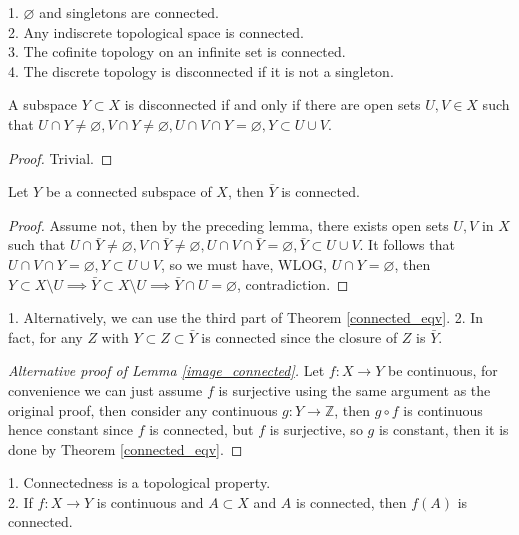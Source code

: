 \begin{example}
    1. $\varnothing$ and singletons are connected.\\
    2. Any indiscrete topological space is connected.\\
    3. The cofinite topology on an infinite set is connected.\\
    4. The discrete topology is disconnected if it is not a singleton.
\end{example}
\begin{lemma}
    A subspace $Y\subset X$ is disconnected if and only if there are open sets $U,V\in X$ such that $U\cap Y\neq\varnothing, V\cap Y\neq\varnothing, U\cap V\cap Y=\varnothing, Y\subset U\cup V$.
\end{lemma}
\begin{proof}
    Trivial.
\end{proof}
\begin{proposition}\label{closure_connected}
    Let $Y$ be a connected subspace of $X$, then $\bar Y$ is connected.
\end{proposition}
\begin{proof}
    Assume not, then by the preceding lemma, there exists open sets $U,V$ in $X$ such that $U\cap\bar Y\neq\varnothing, V\cap\bar Y\neq\varnothing, U\cap V\cap\bar Y=\varnothing, \bar Y\subset U\cup V$.
    It follows that $U\cap V\cap Y=\varnothing, Y\subset U\cup V$, so we must have, WLOG, $U\cap Y=\varnothing$, then $Y\subset X\setminus U\implies\bar Y\subset X\setminus U\implies \bar Y\cap U=\varnothing$, contradiction.
\end{proof}
\begin{remark}
    1. Alternatively, we can use the third part of Theorem \ref{connected_eqv}.
    2. In fact, for any $Z$ with $Y\subset Z\subset\bar Y$ is connected since the closure of $Z$ is $\bar Y$.
\end{remark}
\begin{proof}[Alternative proof of Lemma \ref{image_connected}]
    Let $f:X\to Y$ be continuous, for convenience we can just assume $f$ is surjective using the same argument as the original proof, then consider any continuous $g:Y\to\mathbb Z$, then $g\circ f$ is continuous hence constant since $f$ is connected, but $f$ is surjective, so $g$ is constant, then it is done by Theorem \ref{connected_eqv}.
\end{proof}
\begin{remark}
    1. Connectedness is a topological property.\\
    2. If $f:X\to Y$ is continuous and $A\subset X$ and $A$ is connected, then $f(A)$ is connected.
\end{remark}
